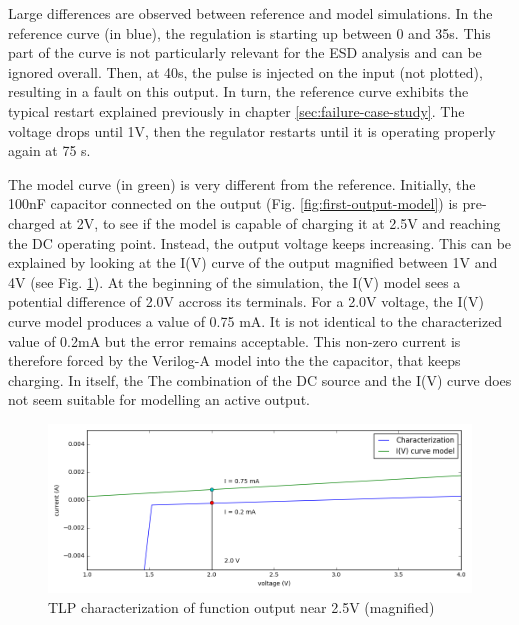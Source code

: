 Large differences are observed between reference and model simulations.
In the reference curve (in blue), the regulation is starting up between 0 and 35\textmu{}s.
This part of the curve is not particularly relevant for the ESD analysis and can be ignored overall.
Then, at 40\textmu{}s, the pulse is injected on the input (not plotted), resulting in a fault on this output.
In turn, the reference curve exhibits the typical restart explained previously in chapter \ref{sec:failure-case-study}.
The voltage drops until 1V, then the regulator restarts until it is operating properly again at 75 \textmu{}s.

The model curve (in green) is very different from the reference.
Initially, the 100nF capacitor connected on the output (Fig. \ref{fig:first-output-model}) is pre-charged at 2V, to see if the model is capable of charging it at 2.5V and reaching the DC operating point.
Instead, the output voltage keeps increasing.
This can be explained by looking at the I(V) curve of the output magnified between 1V and 4V (see Fig. \ref{fig:tlp-output-cz-zoomed}).
At the beginning of the simulation, the I(V) model sees a potential difference of 2.0V accross its terminals.
For a 2.0V voltage, the I(V) curve model produces a value of 0.75 mA.
It is not identical to the characterized value of 0.2mA but the error remains acceptable.
This non-zero current is therefore forced by the Verilog-A model into the the capacitor, that keeps charging.
In itself, the
The combination of the DC source and the I(V) curve does not seem suitable for modelling an active output.

\begin{figure}[!h]
  \centering
  \includegraphics[width=\textwidth]{src/4/figures/tlp_output_characterization_magnified.png}
  \caption{TLP characterization of function output near 2.5V (magnified)}
  \label{fig:tlp-output-cz-zoomed}
\end{figure}

